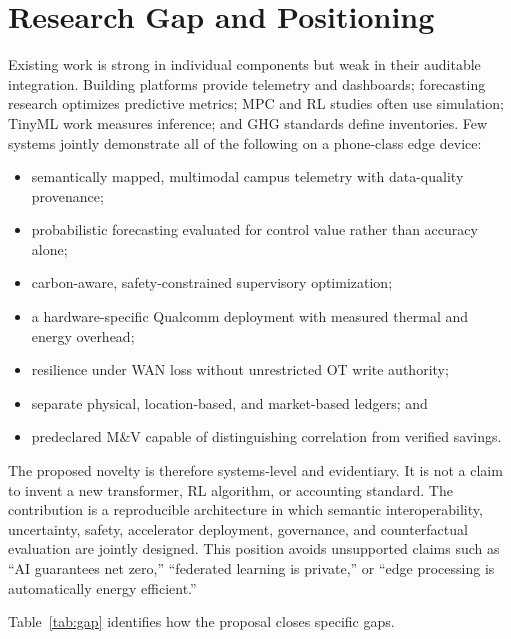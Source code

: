 \section{Research Gap and Positioning}

Existing work is strong in individual components but weak in their auditable integration. Building platforms provide telemetry and dashboards; forecasting research optimizes predictive metrics; MPC and RL studies often use simulation; TinyML work measures inference; and GHG standards define inventories. Few systems jointly demonstrate all of the following on a phone-class edge device:
\begin{itemize}[leftmargin=*]
	\item semantically mapped, multimodal campus telemetry with data-quality provenance;
	\item probabilistic forecasting evaluated for control value rather than accuracy alone;
	\item carbon-aware, safety-constrained supervisory optimization;
	\item a hardware-specific Qualcomm deployment with measured thermal and energy overhead;
	\item resilience under WAN loss without unrestricted OT write authority;
	\item separate physical, location-based, and market-based ledgers; and
	\item predeclared M\&V capable of distinguishing correlation from verified savings.
\end{itemize}

The proposed novelty is therefore systems-level and evidentiary. It is not a claim to invent a new transformer, RL algorithm, or accounting standard. The contribution is a reproducible architecture in which semantic interoperability, uncertainty, safety, accelerator deployment, governance, and counterfactual evaluation are jointly designed. This position avoids unsupported claims such as ``AI guarantees net zero,'' ``federated learning is private,'' or ``edge processing is automatically energy efficient.''

Table~\ref{tab:gap} identifies how the proposal closes specific gaps.

